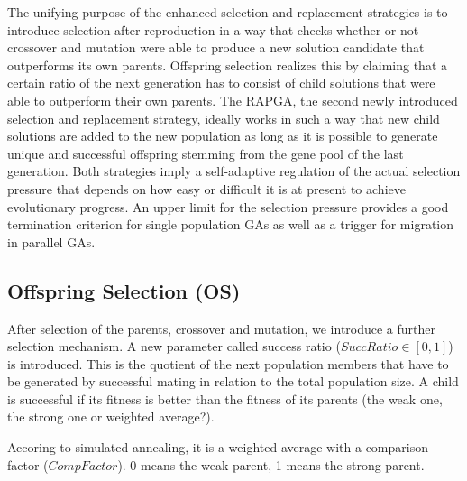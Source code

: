 \documentclass[12pt]{article}
\begin{document}
The unifying purpose of the enhanced selection and replacement strategies is to introduce selection after reproduction in a way that checks whether or not crossover and mutation were able to produce a new solution candidate that outperforms its own parents. Offspring selection realizes this by claiming that a certain ratio of the next generation has to consist of child solutions that were able to outperform their own parents. The RAPGA, the second newly introduced selection and replacement strategy, ideally works in such a way that new child solutions are added to the new population as long as it is possible to generate unique and successful offspring stemming from the gene pool of the last generation. Both strategies imply a self-adaptive regulation of the actual selection pressure that depends on how easy or difficult it is at present to achieve evolutionary progress. An upper limit for the selection pressure provides a good termination criterion for single population GAs as well as a trigger for migration in parallel GAs.

\subsection{Offspring Selection (OS)}
After selection of the parents, crossover and mutation, we introduce a further selection mechanism. A new parameter called success ratio ($SuccRatio \in [0,1]$) is introduced. This is the quotient of the next population members that have to be generated by successful mating in relation to the total population size. A child is successful if its fitness is better than the fitness of its parents (the weak one, the strong one or weighted average?).

Accoring to simulated annealing, it is a weighted average with a comparison factor ($CompFactor$). 0 means the weak parent, 1 means the strong parent.
\end{document}
